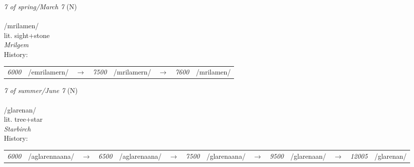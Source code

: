 \vspace{15pt}
\begin{nopagebreak}
 \textit{7 of spring/March 7} (N)\\
\\
\noindent /mril{\textprimstress}amen/\\
\noindent lit. sight+stone\\
\noindent \textit{Mrilgem}\\


\noindent History:

\vspace{-0pt}
\hspace{40pt}
\begin{tabular}{ccc}
\textit{6000} & /emrilamern/&$\rightarrow$ & \textit{7500} & /mrilamern/&$\rightarrow$ & \textit{7600} & /mrilamen/& \\
\end{tabular}

\vspace{20pt}\hline

\end{nopagebreak}
\filbreak



\vspace{15pt}
\begin{nopagebreak}
 \textit{7 of summer/June 7} (N)\\
\\
\noindent /glar{\textprimstress}enan/\\
\noindent lit. tree+star\\
\noindent \textit{Starbirch}\\


\noindent History:

\vspace{-0pt}
\hspace{40pt}
\begin{tabular}{ccc}
\textit{6000} & /aglarennaana/&$\rightarrow$ & \textit{6500} & /aglarenaana/&$\rightarrow$ & \textit{7500} & /glarenaana/&$\rightarrow$ & \textit{9500} & /glarenaan/&$\rightarrow$ & \textit{12005} & /glarenan/& \\
\end{tabular}

\vspace{20pt}\hline

\end{nopagebreak}
\filbreak



